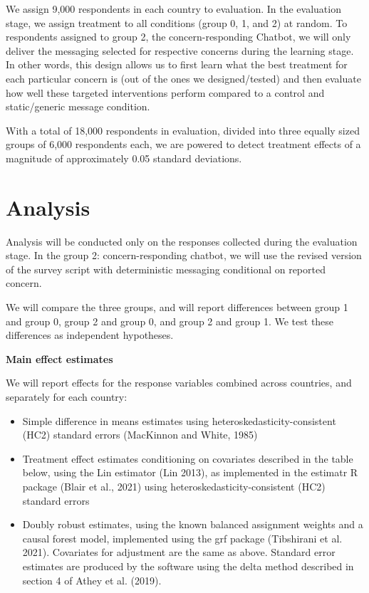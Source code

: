 \documentclass[letterpaper, 12pt, parskip=full,DIV=10]{scrartcl}
\begin{document}
We assign 9,000 respondents in each country to evaluation. In the evaluation stage, we assign treatment to all conditions (group 0, 1, and 2) at random. To respondents assigned to group 2, the concern-responding Chatbot, we will only deliver the messaging selected for respective concerns during the learning stage. In other words, this design allows us to first learn what the best treatment for each particular concern is (out of the ones we designed/tested) and then evaluate how well these targeted interventions perform compared to a control and static/generic message condition.

With a total of 18,000 respondents in evaluation, divided into three equally sized groups of 6,000 respondents each, we are powered to detect treatment effects of a magnitude of approximately 0.05 standard deviations. 


\section{Analysis}
Analysis will be conducted only on the responses collected during the evaluation stage. In the group 2: concern-responding chatbot, we will use the revised version of the survey script with deterministic messaging conditional on reported concern. 

We will compare the three groups, and will report differences between group 1 and group 0, group 2 and group 0, and group 2 and group 1. We test these differences as independent hypotheses. 

\textbf{Main effect estimates}

We will report effects for the response variables combined across countries, and separately for each country:
\begin{itemize}
\item Simple difference in means estimates using heteroskedasticity-consistent (HC2) standard errors (MacKinnon and White, 1985)
\item Treatment effect estimates conditioning on covariates described in the table below, using the Lin estimator (Lin 2013), as implemented in the estimatr R package (Blair et al., 2021) using heteroskedasticity-consistent (HC2) standard errors 
\item Doubly robust estimates, using the known balanced assignment weights and a causal forest model, implemented using the grf package (Tibshirani et al. 2021). Covariates for adjustment are the same as above. Standard error estimates are produced by the software using the delta method described in section 4 of Athey et al. (2019). 
\end{itemize}
\end{document}
